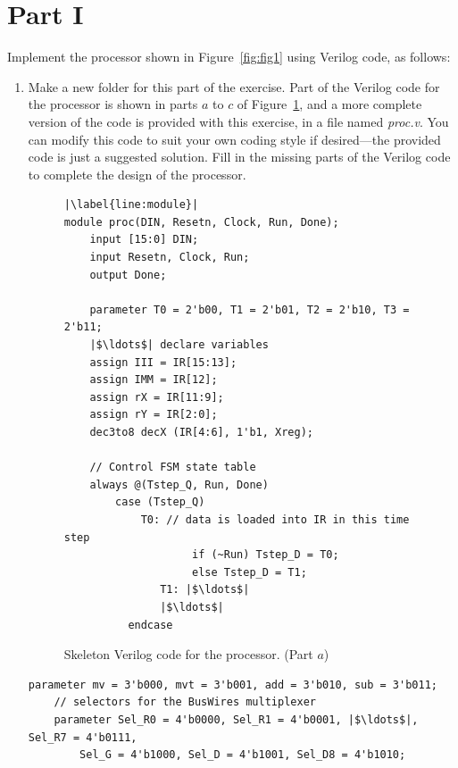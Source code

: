 \documentclass[epsfig,10pt,fullpage]{article}
\begin{document}
\section*{Part I}
Implement the processor shown in Figure~\ref{fig:fig1} using Verilog code, as follows:
\begin{enumerate}
\item Make a new folder for this part of the exercise. 
Part of the Verilog code for the processor is shown in parts $a$ to $c$ of 
Figure~\ref{fig:fig2}, and a more complete version of the code is provided with this exercise,
in a file named {\it proc.v}. You can modify this code to suit your own coding style
if desired---the provided code is just a suggested solution. Fill in the missing parts of
the Verilog code to complete the design of the processor.

\lstset{language=Verilog,numbers=none,escapechar=|}
\begin{figure}[h]
\begin{center}
\begin{minipage}[t]{15 cm}
\begin{lstlisting}[name=proc]
|\label{line:module}|
module proc(DIN, Resetn, Clock, Run, Done);
    input [15:0] DIN;
    input Resetn, Clock, Run;
    output Done;

    parameter T0 = 2'b00, T1 = 2'b01, T2 = 2'b10, T3 = 2'b11;
    |$\ldots$| declare variables
    assign III = IR[15:13];
    assign IMM = IR[12];
    assign rX = IR[11:9];
    assign rY = IR[2:0];
    dec3to8 decX (IR[4:6], 1'b1, Xreg);

    // Control FSM state table
    always @(Tstep_Q, Run, Done)
        case (Tstep_Q)
            T0: // data is loaded into IR in this time step
				    if (~Run) Tstep_D = T0;
				    else Tstep_D = T1;
	 		   T1: |$\ldots$|
	 		   |$\ldots$|
		  endcase
\end{lstlisting}
\end{minipage}
\caption{Skeleton Verilog code for the processor. (Part $a$)}
\label{fig:fig2}
\end{center}
\end{figure}

\begin{center}
\begin{minipage}[t]{15 cm}
\begin{lstlisting}[name=proc]
    parameter mv = 3'b000, mvt = 3'b001, add = 3'b010, sub = 3'b011;
    // selectors for the BusWires multiplexer
    parameter Sel_R0 = 4'b0000, Sel_R1 = 4'b0001, |$\ldots$|, Sel_R7 = 4'b0111,
        Sel_G = 4'b1000, Sel_D = 4'b1001, Sel_D8 = 4'b1010;
	

\end{lstlisting}
\end{minipage}
\end{center}
\end{enumerate}
\end{document}
